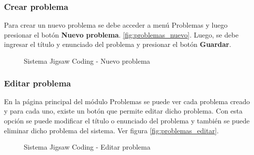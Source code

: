\subsubsection{Crear problema}

Para crear un nuevo problema se debe acceder a menú Problemas y luego presionar el botón \textbf{Nuevo problema}. \autoref{fig:problemas_nuevo}. Luego, se debe ingresar el título y enunciado del problema y presionar el botón \textbf{Guardar}.

\begin{figure}[h!]
\centering
\caption[SJC Nuevo problema]{Sistema Jigsaw Coding - Nuevo problema}
\label{fig:problemas_nuevo}
\end{figure}

\subsubsection{Editar problema}
En la página principal del módulo Problemas se puede ver cada problema creado y para cada uno, existe un botón que permite editar dicho problema. Con esta opción se puede modificar el título o enunciado del problema y también se puede eliminar dicho problema del sistema. Ver figura \autoref{fig:problemas_editar}.

\begin{figure}[h!]
\centering
\caption[SJC Editar problema]{Sistema Jigsaw Coding - Editar problema}
\label{fig:problemas_editar}
\end{figure}

